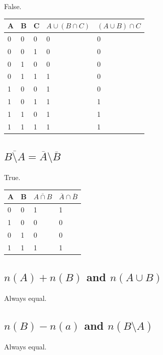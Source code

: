 \documentclass[12pt]{article}
\begin{document}
False.

\begin{table}[H]
\begin{tabular}{lll|ll}
A & B & C & $A \cup (B \cap C)$ & $(A \cup B) \cap C$ \\ \hline
0 & 0 & 0 & 0         & 0         \\
0 & 0 & 1 & 0         & 0         \\
0 & 1 & 0 & 0         & 0         \\
0 & 1 & 1 & 1         & 0         \\
1 & 0 & 0 & 1         & 0         \\
1 & 0 & 1 & 1         & 1         \\
1 & 1 & 0 & 1         & 1         \\
1 & 1 & 1 & 1         & 1         \\
\end{tabular}
\end{table}

\subsection{$\overline{B \setminus A} = \overline{A} \setminus \overline{B}$}

True.

\begin{table}[H]
\begin{tabular}{ll|ll}
A & B & $\overline{A \cap B}$ & $\overline{A} \cap \overline{B}$ \\ \hline
0 & 0 & 1         & 1         \\
1 & 0 & 0         & 0         \\
0 & 1 & 0         & 0         \\
1 & 1 & 1         & 1        
\end{tabular}
\end{table}

\subsection{$n(A) + n(B)$ and $n(A \cup B)$}

Always equal.

\subsection{$n(B) - n(a)$ and $n(B \setminus A)$}

Always equal.
\end{document}
